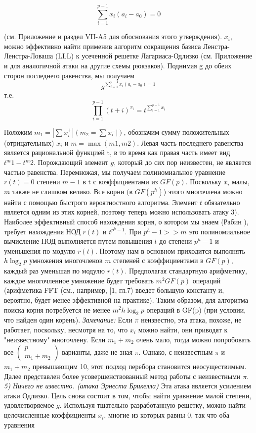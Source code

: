 \documentclass[a4paper,12pt]{article}
\begin{document}
$$\sum_{i=1}^{p-1}x_i(a_i - a_0) = 0$$

(см. Приложение и раздел VII-A5 для обоснования этого утверждения). $x_i$, можно эффективно найти применив алгоритм сокращения базиса Ленстра-Ленстра-Ловаша (LLL) \cite{19} к усеченной решетке Лагариаса-Одлизко (см. Приложение и \cite{22} для аналогичной атаки на другие схемы рюкзаков). Поднимая g до обеих сторон последнего равенства, мы получаем
$$ g^{\sum_{i=1}^{p-1}x_i(a_i - a_0) = 1} $$
т.е.
$$ \prod_{i=1}^{p-1} (t+i)^{x_i} = t^{\sum_{i=1}^{p-1}x_i} $$

Положим $m_1 = |\sum x_i^{+}| (m_2 = \sum x_i^{-}|)$, обозначим сумму положительных
(отрицательных) $x_i$ и $m = \max(m1, m2)$.
Левая часть последнего равенства является рациональной функцией t, в то время как правая часть имеет вид $t^m1 - t^m2$. Порождающий элемент $g$, который до сих пор неизвестен, не является частью равенства. Перемножая, мы получаем полиномиальное уравнение $r(t) = 0$ степени $m - 1$ в t с коэффициентами из $GF(p)$. Поскольку $x_i$ малы, $m$ также не слишком велико. Все корни (в $GF(p^h)$) этого многочлена можно найти с помощью быстрого вероятностного алгоритма. Элемент $t$ обязательно является одним из этих корней, поэтому теперь можно использовать атаку 3). \newline
\indent Наиболее эффективный способ нахождения корня, о котором мы знаем (Рабин \cite{26}), требует нахождения НОД $r(t)$ и $t^{p^h-1}$. При $p^h - 1 >> m$ это полиномиальное вычисление НОД выполняется путем повышения $t$ до степени $p^h - 1$ и уменьшения по модулю $r(t)$. Поэтому нам в основном приходится выполнять $h \log_2 p$ умножения многочленов $m$ степеней с коэффициентами в $GF(p)$, каждый раз уменьшая по модулю $r(t)$. Предполагая стандартную арифметику, каждое многочленное умножение будет требовать $m^2 GF(p)$ операций (арифметика FFT (см., например, [1, гл.7) введет большую константу и, вероятно, будет менее эффективной на практике). Таким образом, для алгоритма поиска корня потребуется не менее $m^2 h \log_2 p$ операций в GF(p) (при условии, что найден один корень). \newline
\indent \textsl{Замечание: } Если $\pi$ неизвестно, эта атака, похоже, не работает, поскольку, несмотря на то, что $x_i$ можно найти, они приводят к "неизвестному" многочлену. Если $m_1 + m_2$ очень мало, тогда можно попробовать все $\begin{pmatrix}p\\m_1 + m_2\end{pmatrix}$ варианты, даже не зная $\pi$. Однако, с неизвестным $\pi$ и $m_1 + m_2$ превышающим 10, этот подход перебора становится неосуществимым. Далее представлен более усовершенствованный метод работы с неизвестными $\pi$. \newline
\indent \textsl{ 5) Ничего не известно. (атака Эрнеста Брикелла)} \newline
Эта атака является усилением атаки Одлизко. Цель снова состоит в том, чтобы найти уравнение малой степени, удовлетворяемое $g$. Используя тщательно разработанную решетку, можно найти целочисленные коэффициенты $x_i$, многие из которых равны 0, так что оба уравнения
\end{document}
